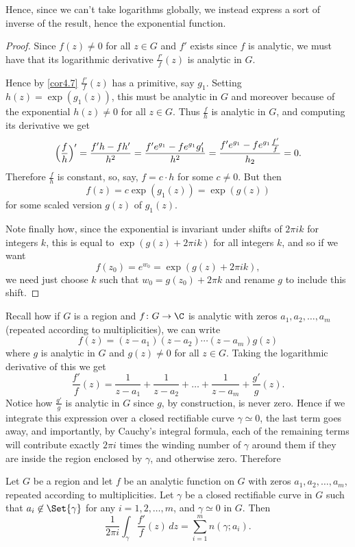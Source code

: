 Hence, since we can't take logarithms globally, we instead express a sort of inverse of the result, hence the exponential function.

\begin{proof}
	Since $f(z) \neq 0$ for all $z \in G$ and $f'$ exists since $f$ is analytic, we must have that its logarithmic derivative $\frac{f'}{f}(z)$ is analytic in $G$.

	Hence by \autoref{cor4.7} $\frac{f'}{f}(z)$ has a primitive, say $g_1$.
	Setting $h(z) = \exp(g_1(z))$, this must be analytic in $G$ and moreover because of the exponential $h(z) \neq 0$ for all $z \in G$.
	Thus $\frac{f}{h}$ is analytic in $G$, and computing its derivative we get
	\[
		\Bigl ( \frac{f}{h} \Bigr )' = \frac{f' h - f h'}{h^2} = \frac{f' e^{g_1} - f e^{g_1} g_1'}{h^2} = \frac{f' e^{g_1} - f e^{g_1} \frac{f'}{f}}{h_2} = 0.
	\]
	Therefore $\frac{f}{h}$ is constant, so, say, $f = c \cdot h$ for some $c \neq 0$.
	But then
	\[
		f(z) = c \exp(g_1(z)) = \exp(g(z))
	\]
	for some scaled version $g(z)$ of $g_1(z)$.

	Note finally how, since the exponential is invariant under shifts of $2 \pi i k$ for integers $k$, this is equal to $\exp(g(z) + 2 \pi i k)$ for all integers $k$, and so if we want
	\[
		f(z_0) = e^{w_0} = \exp(g(z) + 2 \pi i k),
	\]
	we need just choose $k$ such that $w_0 = g(z_0) + 2 \pi  k$ and rename $g$ to include this shift.
\end{proof}


Recall how if $G$ is a region and $f \colon G \to \C$ is analytic with zeros $a_1, a_2, \dots, a_m$ (repeated according to multiplicities), we can write
\[
	f(z) = (z - a_1) (z - a_2) \dotsm (z - a_m) g(z)
\]
where $g$ is analytic in $G$ and $g(z) \neq 0$ for all $z \in G$.
Taking the logarithmic derivative of this we get
\[
	\frac{f'}{f}(z) = \frac{1}{z - a_1} + \frac{1}{z - a_2} + \dots + \frac{1}{z - a_m} + \frac{g'}{g}(z).
\]
Notice how $\frac{g'}{g}$ is analytic in $G$ since $g$, by construction, is never zero.
Hence if we integrate this expression over a closed rectifiable curve $\gamma \simeq 0$, the last term goes away, and importantly, by Cauchy's integral formula, each of the remaining terms will contribute exactly $2 \pi i$ times the winding number of $\gamma$ around them if they are inside the region enclosed by $\gamma$, and otherwise zero.
Therefore

\begin{theorem}\label{thm4.9}
	Let $G$ be a region and let $f$ be an analytic function on $G$ with zeros $a_1, a_2, \dots, a_m$, repeated according to multiplicities.
	Let $\gamma$ be a closed rectifiable curve in $G$ such that $a_i \not\in \Set{\gamma}$ for any $i = 1, 2, \dots, m$, and $\gamma \simeq 0$ in $G$.
	Then
	\[
		\frac{1}{2 \pi i} \int_\gamma \frac{f'}{f}(z) \, d z = \sum_{i = 1}^{m} n(\gamma; a_i).
	\]
\end{theorem}

